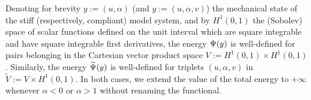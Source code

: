 
Denoting for brevity $y:=(u, \alpha)$ (and $y:=(u, \alpha, v)$) the mechanical state of the stiff (respectively, compliant) model system, and by $H^1(0, 1)$ the (Sobolev) space of scalar functions defined on the unit interval which are square integrable and have square integrable first derivatives, the energy $\Psi(y)$ is well-defined for pairs belonging in the Cartesian vector product space $V:=H^1(0,1)\times  H^1(0,1)$. Similarly, the energy $\widetilde\Psi(y)$ is well-defined for triplets $(u, \alpha, v)$ in $\widetilde V:=V\times  H^1(0,1)$. In both cases, we extend the value of the total energy to $+\infty$ whenever $\alpha < 0$ or $\alpha > 1$ without renaming the functional.









